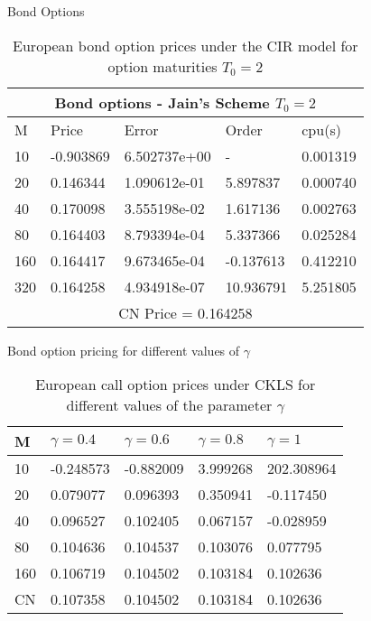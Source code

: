 \documentclass{beamer}
\begin{document}
\begin{frame}{Bond Options}
    \begin{table}[htp]
    \begin{tabular}{ |p{1cm}|p{1.7cm}|p{2.5cm}|p{2cm}|p{1.5cm}|  }
    
     \hline
    \multicolumn{5}{|c|}{Bond options - Jain’s Scheme   $T_0 = 2$   } \\
     \hline
     M & Price & Error & Order & cpu(s)\\
     \hline
    10 & -0.903869 & 6.502737e+00 &  - & 0.001319\\
    20 & 0.146344 & 1.090612e-01 & 5.897837 & 0.000740\\
    40 & 0.170098 & 3.555198e-02 & 1.617136 & 0.002763\\
    80 & 0.164403 & 8.793394e-04 & 5.337366 & 0.025284\\
    160 & 0.164417 & 9.673465e-04 & -0.137613 & 0.412210\\
    320 & 0.164258 & 4.934918e-07 & 10.936791 & 5.251805\\
     \hline
     \multicolumn{5}{|c|}{CN Price = 0.164258} \\
     \hline
     
    \end{tabular}
    \caption{ European bond option prices under the CIR model for option maturities $T_0 = 2$ }

        
    \end{table}
\end{frame}

\begin{frame}{Bond option pricing for different values of $\gamma$}
    \begin{table}[htp]
    \begin{tabular}{ |p{1cm}|p{2cm}|p{2cm}|p{2cm}|p{2cm}|  }
    
    \hline
     M & $\gamma = 0.4$ & $\gamma = 0.6$ & $\gamma = 0.8$ & $\gamma = 1$\\
     \hline
    10 & -0.248573 & -0.882009 &  3.999268 & 202.308964\\
    20 & 0.079077 & 0.096393 & 0.350941 & -0.117450\\
    40 & 0.096527 & 0.102405 & 0.067157 & -0.028959\\
    80 & 0.104636 & 0.104537 & 0.103076 & 0.077795\\
    160 & 0.106719  & 0.104502 & 0.103184 & 0.102636\\
    
     \hline
     CN & 0.107358 & 0.104502 & 0.103184 & 0.102636\\
     \hline
     
    \end{tabular}
    \caption{ European call option prices under CKLS for different values of the parameter $\gamma$ }

    
    \end{table}
\end{frame}
 
\end{document}
